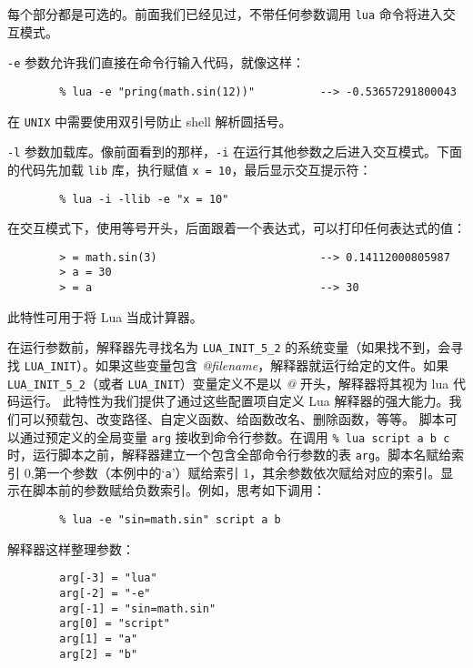 每个部分都是可选的。前面我们已经见过，不带任何参数调用 \verb|lua| 命令将进入交互模式。 

\verb|-e| 参数允许我们直接在命令行输入代码，就像这样：

\begin{verbatim}
        % lua -e "pring(math.sin(12))"          --> -0.53657291800043
\end{verbatim}

在 \verb|UNIX| 中需要使用双引号防止 shell 解析圆括号。

\verb|-l| 参数加载库。像前面看到的那样，\verb|-i| 在运行其他参数之后进入交互模式。下面的代码先加载 \verb|lib| 库，执行赋值 \verb|x = 10|，最后显示交互提示符：

\begin{verbatim}
        % lua -i -llib -e "x = 10"
\end{verbatim}

在交互模式下，使用等号开头，后面跟着一个表达式，可以打印任何表达式的值：

\begin{verbatim}
        > = math.sin(3)                         --> 0.14112000805987
        > a = 30
        > = a                                   --> 30
\end{verbatim}

此特性可用于将 Lua 当成计算器。

在运行参数前，解释器先寻找名为 \verb|LUA_INIT_5_2| 的系统变量（如果找不到，会寻找 \verb|LUA_INIT|）。如果这些变量包含 \textit{@filename}，解释器就运行给定的文件。如果 \verb|LUA_INIT_5_2|（或者 \verb|LUA_INIT|）变量定义不是以 \textit{@} 开头，解释器将其视为 lua 代码运行。 此特性为我们提供了通过这些配置项自定义 Lua 解释器的强大能力。我们可以预载包、改变路径、自定义函数、给函数改名、删除函数，等等。
脚本可以通过预定义的全局变量 \verb|arg| 接收到命令行参数。在调用 \verb|% lua script a b c|时，运行脚本之前，解释器建立一个包含全部命令行参数的表 \verb|arg|。脚本名赋给索引 0,第一个参数（本例中的`\verb|a|'）赋给索引 1，其余参数依次赋给对应的索引。显示在脚本前的参数赋给负数索引。例如，思考如下调用：

\begin{verbatim}
        % lua -e "sin=math.sin" script a b
\end{verbatim}

解释器这样整理参数：

\begin{verbatim}
        arg[-3] = "lua"
        arg[-2] = "-e"
        arg[-1] = "sin=math.sin"
        arg[0] = "script"
        arg[1] = "a"
        arg[2] = "b"
\end{verbatim}

